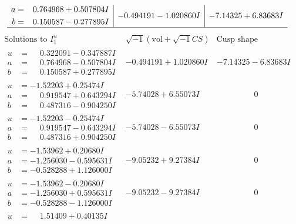 \documentclass[1p]{elsarticle_modified}
\theoremstyle{definition}
\newcommand{\I}{\sqrt{-1}}
\begin{document}
$$\begin{array}{c|c|c}
\begin{aligned}
a &= \phantom{-}0.764968 + 0.507804 I \\
b &= \phantom{-}0.150587 - 0.277895 I\end{aligned}
 & -0.494191 - 1.020860 I & -7.14325 + 6.83683 I\\
 \hline 
 \end{array}$$\newpage$$\begin{array}{c|c|c}  
\text{Solutions to }I^u_{1}& \I (\text{vol} + \sqrt{-1}CS) & \text{Cusp shape}\\
 \hline 
\begin{aligned}
u &= \phantom{-}0.322091 - 0.347887 I \\
a &= \phantom{-}0.764968 - 0.507804 I \\
b &= \phantom{-}0.150587 + 0.277895 I\end{aligned}
 & -0.494191 + 1.020860 I & -7.14325 - 6.83683 I \\ \hline\begin{aligned}
u &= -1.52203 + 0.25474 I \\
a &= \phantom{-}0.919547 + 0.643294 I \\
b &= \phantom{-}0.487316 - 0.904250 I\end{aligned}
 & -5.74028 + 6.55073 I & \phantom{-0.000000 } 0 \\ \hline\begin{aligned}
u &= -1.52203 - 0.25474 I \\
a &= \phantom{-}0.919547 - 0.643294 I \\
b &= \phantom{-}0.487316 + 0.904250 I\end{aligned}
 & -5.74028 - 6.55073 I & \phantom{-0.000000 } 0 \\ \hline\begin{aligned}
u &= -1.53962 + 0.20680 I \\
a &= -1.256030 - 0.595631 I \\
b &= -0.528288 + 1.126000 I\end{aligned}
 & -9.05232 + 9.27384 I & \phantom{-0.000000 } 0 \\ \hline\begin{aligned}
u &= -1.53962 - 0.20680 I \\
a &= -1.256030 + 0.595631 I \\
b &= -0.528288 - 1.126000 I\end{aligned}
 & -9.05232 - 9.27384 I & \phantom{-0.000000 } 0 \\ \hline\begin{aligned}
u &= \phantom{-}1.51409 + 0.40135 I \\

\end{aligned}
\end{array}$$
\end{document}
